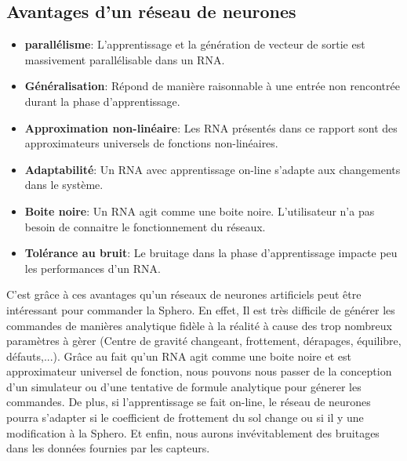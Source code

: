 \subsection{Avantages d'un réseau de neurones}
\begin{itemize}
 \item \textbf{parallélisme}: L'apprentissage et la génération de vecteur de sortie est massivement parallélisable dans un RNA.\cite{corelet,Haykin}
 \item \textbf{Généralisation}: Répond de manière raisonnable à une entrée non rencontrée durant la phase d'apprentissage.\cite{statistica,Haykin}
 \item \textbf{Approximation non-linéaire}: Les RNA présentés dans ce rapport sont des approximateurs universels de fonctions non-linéaires.\cite{Haykin}
 \item \textbf{Adaptabilité}: Un RNA avec apprentissage on-line s'adapte aux changements dans le système.\cite{Haykin}
 \item \textbf{Boite noire}: Un RNA agit comme une boite noire. L'utilisateur n'a pas besoin de connaitre le fonctionnement du réseaux.
 \item \textbf{Tolérance au bruit}: Le bruitage dans la phase d'apprentissage impacte peu les performances d'un RNA.\cite{Haykin}
\end{itemize}
C'est grâce à ces avantages qu'un réseaux de neurones artificiels peut être intéressant pour commander la Sphero.
En effet, Il est très difficile de générer les commandes de manières analytique fidèle à la réalité à cause des trop nombreux paramètres à gèrer (Centre de gravité changeant, frottement, dérapages, équilibre, défauts,...).
Grâce au fait qu'un RNA agit comme une boite noire et est approximateur universel de fonction, nous pouvons nous passer de la conception d'un simulateur ou d'une tentative de formule analytique pour génerer les commandes.
De plus, si l'apprentissage se fait on-line, le réseau de neurones pourra s'adapter si le coefficient de frottement du sol change ou si il y une modification à la Sphero.
Et enfin, nous aurons invévitablement des bruitages dans les données fournies par les capteurs.